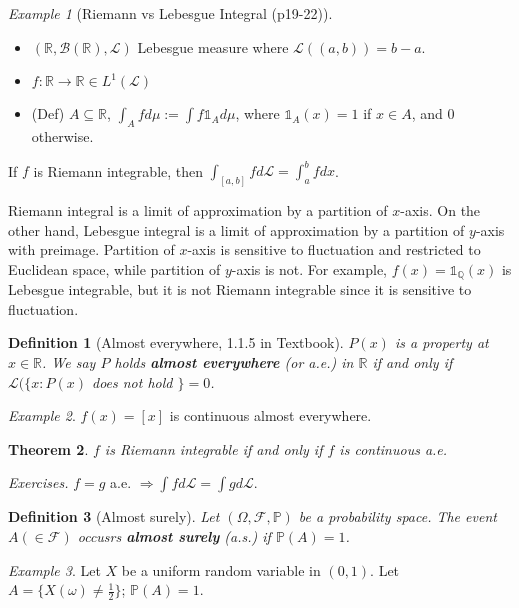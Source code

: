\documentclass[12pt]{report}
\renewcommand{\subset}{\subseteq}
\theoremstyle{break}
\newtheorem{thm}{Theorem}[section] %
\theoremstyle{newdef}
\newtheorem{defn}[thm]{Definition} %
\theoremstyle{remark}
\newtheorem*{exmp}{Example} %
\begin{document}
\begin{exmp}[Riemann vs Lebesgue Integral (p19-22)]
\leavevmode
\begin{itemize}
\item $(\mathbb{R}, \mathcal{B}(\mathbb{R}), \mathcal{L})$ Lebesgue measure where $\mathcal{L}((a,b)) = b-a$.
\item $f : \mathbb{R} \rightarrow \mathbb{R} \in L^1(\mathcal{L})$
\item (Def) $A \subset \mathbb{R}$, $\int_A fd\mu := \int f \mathbb{1}_A d\mu$, where $\mathbb{1}_A(x) = 1$ if $x \in A$, and $0$ otherwise.
\end{itemize}
If $f$ is Riemann integrable, then $\int_{[a,b]} fd\mathcal{L} = \int_a^b fdx$.

Riemann integral is a limit of approximation by a partition of $x$-axis.
On the other hand, Lebesgue integral is a limit of approximation by a partition of $y$-axis with preimage.
Partition of $x$-axis is sensitive to fluctuation and restricted to Euclidean space, while partition of $y$-axis is not.
For example, $f(x) = \mathbb{1}_\mathbb{Q}(x)$ is Lebesgue integrable, but it is not Riemann integrable since it is sensitive to fluctuation.
\end{exmp}

\begin{defn}[Almost everywhere, 1.1.5 in Textbook]
$P(x)$ is a property at $x \in \mathbb{R}$.
We say $P$ holds \textbf{almost everywhere} (or a.e.) in $\mathbb{R}$ if and only if
$\mathcal{L}(\{x:P(x)$ does not hold $\} = 0$.
\end{defn}

\begin{exmp}
$f(x) = [x]$ is continuous almost everywhere.
\end{exmp}


\begin{thm}
$f$ is Riemann integrable if and only if $f$ is continuous a.e.
\end{thm}

\textit{Exercises.} $f = g$ a.e. $\Rightarrow \int fd\mathcal{L} = \int g d\mathcal{L}$.

\begin{defn}[Almost surely]
Let $(\Omega, \mathcal{F}, \mathbb{P})$ be a probability space.
The event $A (\in \mathcal{F})$ occusrs \textbf{almost surely} (a.s.) if $\mathbb{P}(A) = 1$.
\end{defn}

\begin{exmp}
Let $X$ be a uniform random variable in $(0,1)$.
Let $A = \{ X(\omega) \neq \frac{1}{2}\}$; $\mathbb{P}(A) = 1$.
\end{exmp}
\end{document}
